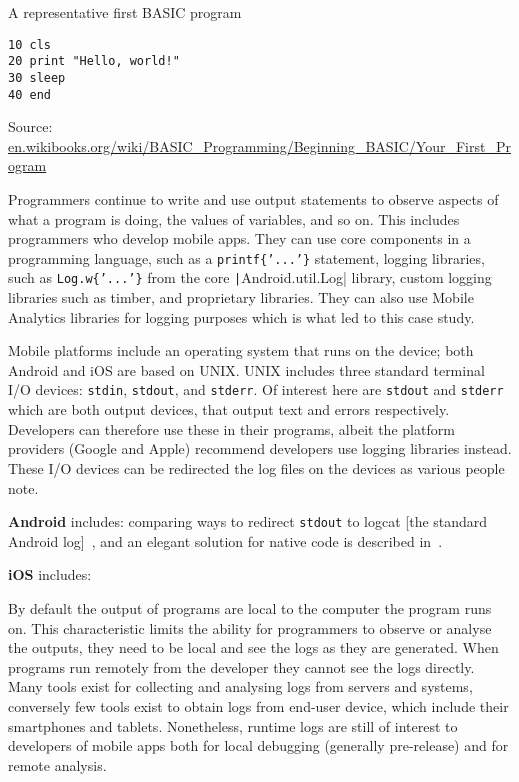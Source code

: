 \begin{listing}
\caption{A representative first BASIC program} \label{code:basic_example}
\begin{verbatim}
10 cls
20 print "Hello, world!"
30 sleep
40 end
\end{verbatim}
Source: \href{https://en.wikibooks.org/wiki/BASIC_Programming/Beginning_BASIC/Your_First_Program}{en.wikibooks.org/wiki/BASIC\_Programming/Beginning\_BASIC/Your\_First\_Program}
\end{listing}

Programmers continue to write and use output statements to observe aspects of what a program is doing, the values of variables, and so on. This includes programmers who develop mobile apps. They can use core components in a programming language, such as a \texttt{printf\{'...'\}} statement, logging libraries, such as \texttt{Log.w\{'...'\}} from the core \texttt|Android.util.Log|
library, custom logging libraries such as timber, and proprietary libraries. They can also use Mobile Analytics libraries for logging purposes which is what led to this case study.

Mobile platforms include an operating system that runs on the device; both Android and iOS are based on UNIX. UNIX includes three standard terminal I/O devices: \texttt{stdin}, \texttt{stdout}, and \texttt{stderr}. Of interest here are \texttt{stdout} and \texttt{stderr} which are both output devices, that output text and errors respectively. Developers can therefore use these in their programs, albeit the platform providers (Google and Apple) recommend developers use logging libraries instead. These I/O devices can be redirected the log files on the devices as various people note.

\textbf{Android} includes: comparing ways to redirect \texttt{stdout} to logcat [the standard Android log]~\citep{krysmanski2012_so_redirect-stdout-to-logcat-in-android-NDK, rcdailey2018_ndk_redirect_to_logcats}, and an elegant solution for native code is described in~\citep{tsiombikas2014_native_NDK_stdio_to_android_log}.

\textbf{iOS} includes: 

By default the output of programs are local to the computer the program runs on. This characteristic limits the ability for programmers to observe or analyse the outputs, they need to be local and see the logs as they are generated. 
%
When programs run remotely from the developer they cannot see the logs directly. Many tools exist for collecting and analysing logs from servers and systems, conversely few tools exist to obtain logs from end-user device, which include their smartphones and tablets. Nonetheless, runtime logs are still of interest to developers of mobile apps both for local debugging (generally pre-release) and for remote analysis.



